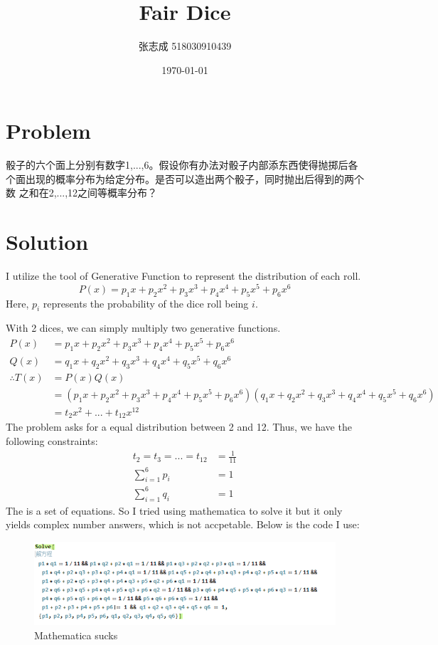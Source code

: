 \documentclass[UTF8, 12pt]{ctexart}
\title{Fair Dice}
\author{张志成 518030910439}
\date{\today}
\begin{document}
    \maketitle

    \section{Problem}
    骰子的六个面上分别有数字1,...,6。假设你有办法对骰子内部添东西使得抛掷后各个面出现的概率分布为给定分布。是否可以造出两个骰子，同时抛出后得到的两个数
    之和在2,...,12之间等概率分布？

    \section{Solution}
    I utilize the tool of Generative Function to represent the distribution of each roll. 
    $$ P(x) = p_1x + p_2x^2 + p_3x^3 + p_4x^4 + p_5x^5 + p_6x^6 $$
    Here, $p_i$ represents the probability of the dice roll being $i$.
    
    With 2 dices, we can simply multiply two generative functions.
    \begin{align*}
        P(x) &= p_1x + p_2x^2 + p_3x^3 + p_4x^4 + p_5x^5 + p_6x^6 \\
        Q(x) &= q_1x + q_2x^2 + q_3x^3 + q_4x^4 + q_5x^5 + q_6x^6 \\
        \therefore T(x) &= P(x)Q(x) \\ &= (p_1x + p_2x^2 + p_3x^3 + p_4x^4 + p_5x^5 + p_6x^6)(q_1x + q_2x^2 + q_3x^3 + q_4x^4 + q_5x^5 + q_6x^6) \\
        &= t_2x^2 + ... + t_{12}x^{12}
    \end{align*}
    The problem asks for a equal distribution between 2 and 12.
    Thus, we have the following constraints:
    \begin{align}
        t_2 = t_3 = ... = t_{12} &= \frac{1}{11} \\
        \sum_{i = 1}^{6} p_i &= 1 \\
        \sum_{i = 1}^{6} q_i &= 1
    \end{align}
    The is a set of equations. So I tried using mathematica to solve it but it only yields complex number answers, which is not accpetable. Below is the code I use:
    \begin{figure}[htbp]
        \includegraphics{solve.png}
        \caption{Mathematica sucks}
    \end{figure}
\end{document}
